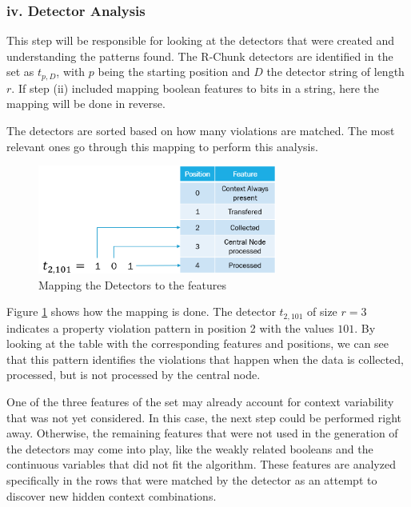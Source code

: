 
\subsubsection{iv. Detector Analysis}

This step will be responsible for looking at the detectors that were created and understanding the patterns found. The R-Chunk detectors are identified in the set as \(t_{p, D}\), with \(p\) being the starting position and \(D\) the detector string of length \(r\). If step (ii) included mapping boolean features to bits in a string, here the mapping will be done in reverse. 

The detectors are sorted based on how many violations are matched. The most relevant ones go through this mapping to perform this analysis.

\begin{figure}[!h]
	\centering
	\includegraphics[width=0.7\textwidth, keepaspectratio]{img/detectoAnalysis.png}
	\caption{Mapping the Detectors to the features}
	\label{fig:detectoAnalysis}
\end{figure}

Figure \ref{fig:detectoAnalysis} shows how the mapping is done. The detector \(t_{2, 101}\) of size \(r = 3\) indicates a property violation pattern in position 2 with the values \(101\). By looking at the table with the corresponding features and positions, we can see that this pattern identifies the violations that happen when the data is collected, processed, but is not processed by the central node.  

One of the three features of the set may already account for context variability that was not yet considered. In this case, the next step could be performed right away. Otherwise, the remaining features that were not used in the generation of the detectors may come into play, like the weakly related booleans and the continuous variables that did not fit the algorithm. These features are analyzed specifically in the rows that were matched by the detector as an attempt to discover new hidden context combinations.



